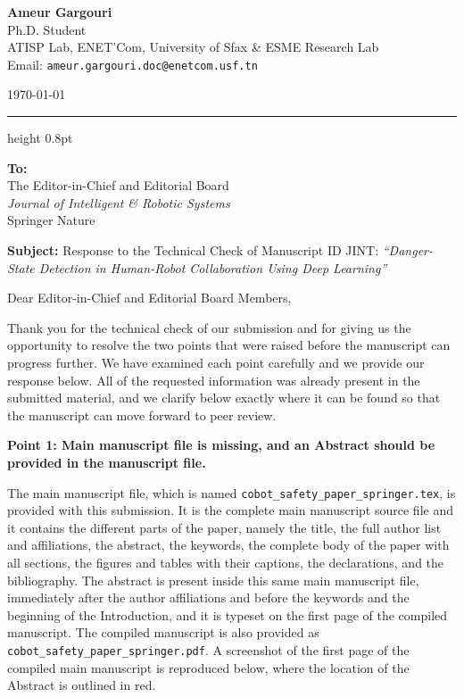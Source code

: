 \documentclass[11pt,a4paper]{article}
\newcommand{\point}[1]{%
  \par\vspace{0.5em}%
  \noindent\textbf{#1}\par\vspace{1pt}%
}
\begin{document}
\begin{minipage}[t]{0.68\textwidth}
    {\large \textbf{Ameur Gargouri}} \\
    Ph.D. Student \\
    ATISP Lab, ENET'Com, University of Sfax \& ESME Research Lab \\
    Email: \texttt{ameur.gargouri.doc@enetcom.usf.tn}
\end{minipage}
\hfill
\begin{minipage}[t]{0.28\textwidth}
    \raggedleft
    \today
\end{minipage}

\vspace{0.8em}
\hrule height 0.8pt
\vspace{0.8em}

\textbf{To:} \\
The Editor-in-Chief and Editorial Board \\
\textit{Journal of Intelligent \& Robotic Systems} \\
Springer Nature

\vspace{0.6em}

\textbf{Subject:} Response to the Technical Check of Manuscript ID JINT: \textit{``Danger-State Detection in Human-Robot Collaboration Using Deep Learning''}

\vspace{0.5em}

Dear Editor-in-Chief and Editorial Board Members,

Thank you for the technical check of our submission and for giving us the opportunity to resolve the two points that were raised before the manuscript can progress further. We have examined each point carefully and we provide our response below. All of the requested information was already present in the submitted material, and we clarify below exactly where it can be found so that the manuscript can move forward to peer review.

\point{Point 1: Main manuscript file is missing, and an Abstract should be provided in the manuscript file.}

The main manuscript file, which is named \texttt{cobot\_safety\_paper\_springer.tex}, is provided with this submission. It is the complete main manuscript source file and it contains the different parts of the paper, namely the title, the full author list and affiliations, the abstract, the keywords, the complete body of the paper with all sections, the figures and tables with their captions, the declarations, and the bibliography. The abstract is present inside this same main manuscript file, immediately after the author affiliations and before the keywords and the beginning of the Introduction, and it is typeset on the first page of the compiled manuscript. The compiled manuscript is also provided as \texttt{cobot\_safety\_paper\_springer.pdf}. A screenshot of the first page of the compiled main manuscript is reproduced below, where the location of the Abstract is outlined in red.
\end{document}
